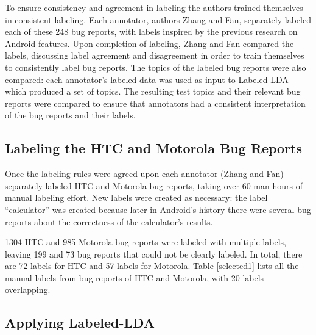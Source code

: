 \documentclass[10pt, conference, compsocconf]{IEEEtran}
\begin{document}
To ensure consistency and agreement in labeling the authors trained
themselves in consistent labeling.
Each annotator, authors Zhang and Fan, separately labeled each of
these 248 bug reports, with labels inspired by the previous research
on Android features.
Upon completion of labeling, Zhang and Fan compared the labels,
discussing label agreement and disagreement in order to train
themselves to consistently label bug reports.
The topics of the labeled bug reports were also compared: each
annotator's labeled data was used as input to Labeled-LDA which
produced a set of topics.
The resulting test topics and their relevant bug reports were
compared to ensure that annotators had a consistent interpretation of
the bug reports and their labels.




\subsection{Labeling the HTC and Motorola Bug Reports}

Once the labeling rules were agreed upon each annotator (Zhang and Fan)
separately labeled HTC and Motorola bug reports, taking over 60 man
hours of manual labeling effort.
New labels were created as necessary: the label ``calculator'' was
created because later in Android's history there were several bug
reports about the correctness of the calculator's results.


1304 HTC and 985 Motorola bug reports were labeled with multiple
labels, leaving 199 and 73 bug reports that could not be clearly labeled.
In total, there are 72 labels for HTC and 57 labels for Motorola.
Table \ref{selected1} lists all the manual labels from bug reports of HTC
and Motorola,
with 20 labels overlapping.

\subsection{Applying Labeled-LDA}



\end{document}
